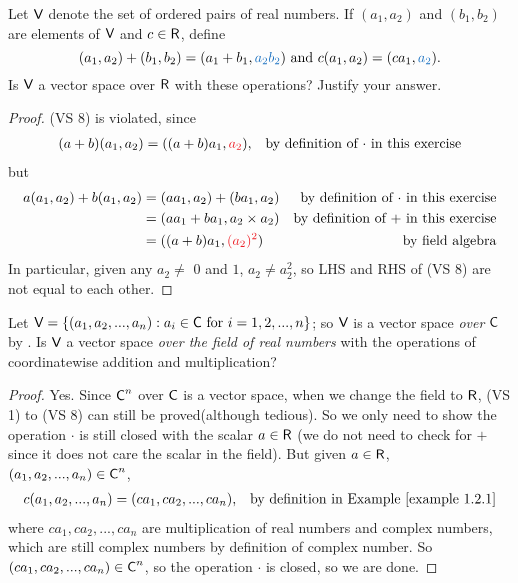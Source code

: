 \begin{exercise} \label{exercise 1.2.13}
Let \(\textsf{V}\) denote the set of ordered pairs of real numbers.
If \((a_1, a_2)\) and \((b_1, b_2)\) are elements of \(\textsf{V}\) and \(c \in \textsf{R}\), define
\[
    (a_1, a_2) + (b_1, b_2) = (a_1 + b_1, \BLUE{a_2 b_2}) \text{ and } c(a_1, a_2) = (c a_1, \BLUE{a_2}).
\]
Is \(\textsf{V}\) a vector space over \(\textsf{R}\) with these operations?
Justify your answer.
\end{exercise}

\begin{proof}
 (VS 8) is violated, since
\begin{align*}
    (a + b)(a_1, a_2) & = ((a + b)a_1, \RED{a_2}), & \text{by definition of \(\cdot\) in this exercise}
\end{align*}
but
\begin{align*}
    a(a_1, a_2) + b(a_1, a_2) & = (a a_1, a_2) + (b a_1, a_2) & \text{by definition of \(\cdot\) in this exercise} \\
                              & = (a a_1 + b a_1, a_2 \X a_2) & \text{by definition of \(+\) in this exercise} \\
                              & = ((a + b)a_1, \RED{(a_2)^2}) & \text{by field algebra}
\end{align*}
In particular, given any \(a_2 \ne\) \(0\) and \(1\), \(a_2 \ne a_2^2\), so LHS and RHS of (VS 8) are not equal to each other.
\end{proof}

\begin{exercise} \label{exercise 1.2.14}
Let \(\textsf{V} = \{(a_1, a_2, ..., a_n): a_i \in \textsf{C} \text{ for } i = 1, 2, ..., n\}\);
so \(\textsf{V}\) is a vector space \emph{over} \(\textsf{C}\) by .
Is \(\textsf{V}\) a vector space \emph{over the field of real numbers} with the operations of coordinatewise addition and multiplication?
\end{exercise}

\begin{proof}
Yes.
Since \(\textsf{C}^n\) over \(\textsf{C}\) is a vector space, when we change the field to \(\textsf{R}\),  (VS 1) to (VS 8) can still be proved(although tedious).
So we only need to show the operation \(\cdot\) is still closed with the scalar \(a \in \textsf{R}\)
(we do not need to check for \(+\) since it does not care the scalar in the field).
But given \(a \in \textsf{R}\), \((a_1, a_2, ..., a_n) \in \textsf{C}^n\),
\begin{align*}
    c (a_1, a_2, ..., a_n) & = (c a_1, c a_2, ..., c a_n), & \text{by definition in \EXAMPLE{1.2.1}}
\end{align*}
where \(c a_1, c a_2, ..., c a_n\) are multiplication of real numbers and complex numbers, which are still complex numbers by definition of complex number.
So \((c a_1, c a_2, ..., c a_n) \in \textsf{C}^n\), so the operation \(\cdot\) is closed, so we are done.
\end{proof}

